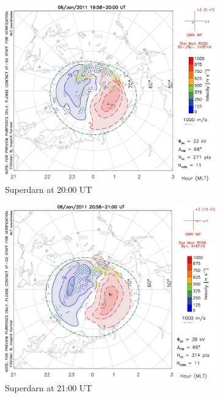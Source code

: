 \documentclass[10pt,a4paper]{article}
\begin{document}
\begin{figure}
\begin{subfigure}{0.3\textwidth}
\centering
	\includegraphics[width=\textwidth]{Superdarn3.jpg}
	\caption{ Superdarn at 20:00 UT \label{Super_20}}
\end{subfigure}
\begin{subfigure}{0.3\textwidth}
\centering
	\includegraphics[width=\textwidth]{Superdarn4.jpg}
	\caption{ Superdarn at 21:00 UT \label{Super_21}}
\end{subfigure}
\begin{subfigure}{0.3\textwidth}

\end{subfigure}
\end{figure}
\end{document}
